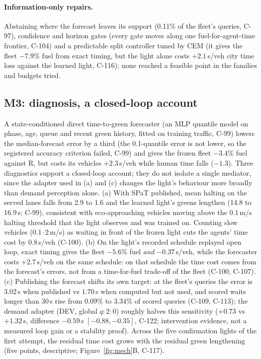 \documentclass[11pt]{article}
\begin{document}
\paragraph{Information-only repairs.} Abstaining where the forecast leaves its support (0.11\% of the fleet's queries, C-97), confidence and
horizon gates (every gate moves along one fuel-for-agent-time frontier, C-104) and a predictable split controller tuned by CEM (it gives the
fleet $-7.9\%$ fuel from exact timing, but the light alone costs $+2.1$\,s/veh city time loss against the learned light, C-116); none
reached a feasible point in the families and budgets tried.

\subsection{M3: diagnosis, a closed-loop account}\label{sec:diag}
A state-conditioned direct time-to-green forecaster (an MLP quantile model on phase, age, queue and recent green history, fitted on training
traffic, C-99) lowers the median-forecast error by a third (the 0.1-quantile error is not lower, so the
registered accuracy criterion failed, C-99) and gives the frozen fleet $-3.4\%$ fuel against R, but costs its vehicles
$+2.3$\,s/veh while human time falls ($-1.3$). Three diagnostics support a closed-loop account; they do not isolate a single mediator,
since the adapter used in (a) and (c) changes the light's behaviour more broadly than demand perception alone.
(a) With SPaT published, mean halting on the served lanes falls from 2.9 to 1.6 and the learned light's greens lengthen (14.8 to 16.9\,s; C-99),
consistent with eco-approaching vehicles moving above the $0.1$\,m/s halting threshold that the light observes and was trained on. Counting slow vehicles
(0.1--2\,m/s) as waiting in front of the frozen light cuts the agents' time cost by $0.8$\,s/veh (C-100).
(b) On the light's recorded schedule replayed open loop, exact timing gives the fleet $-5.6\%$ fuel \emph{and} $-0.37$\,s/veh, while the forecaster
costs $+2.7$\,s/veh on the same schedule: on that schedule the time cost comes from the forecast's errors, not from a time-for-fuel
trade-off of the fleet (C-100, C-107).
(c) Publishing the forecast shifts its own target: at the fleet's queries the error is $3.02$\,s when published vs $1.70$\,s when computed
but not used, and scored waits longer than 30\,s rise from $0.09\%$ to $3.34\%$ of scored queries (C-109, C-113); the demand adapter (DEV, global $q{:}2{:}0$) roughly halves this
sensitivity ($+0.73$ vs $+1.32$\,s, difference $-0.59$\,s $[-0.88,-0.35]$, C-122; intervention evidence, not a measured loop gain or a stability proof). Across the five confirmation lights of the first attempt, the residual time cost grows with the residual green
lengthening (five points, descriptive; Figure~\ref{fig:mech}B, C-117).
\end{document}
